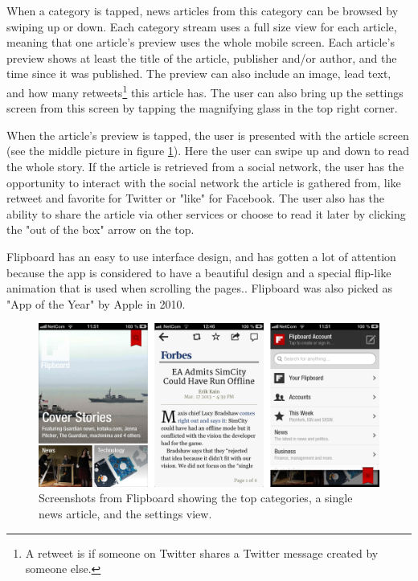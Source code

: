 When a category is tapped, news articles from this category can be browsed by swiping up or down. Each category stream uses a full size view for each article, meaning that one article's preview uses the whole mobile screen. Each article's preview shows at least the title of the article, publisher and/or author, and the time since it was published. The preview can also include an image, lead text, and how many retweets\footnote{A retweet is if someone on Twitter shares a Twitter message created by someone else.} this article has. The user can also bring up the settings screen from this screen by tapping the magnifying glass in the top right corner.

When the article's preview is tapped, the user is presented with the article screen (see the middle picture in figure \ref{screenshots_flipboard}). Here the user can swipe up and down to read the whole story. If the article is retrieved from a social network, the user has the opportunity to interact with the social network the article is gathered from, like retweet and favorite for Twitter or "like" for Facebook. The user also has the ability to share the article via other services or choose to read it later by clicking the "out of the box" arrow on the top.

Flipboard has an easy to use interface design, and has gotten a lot of attention because the app is considered to have a beautiful design\cite{flipboard_design} and a special flip-like animation that is used when scrolling the pages.\cite{flipboard_video}\cite{flipboard_animation}. Flipboard was also picked as "App of the Year" by Apple in 2010\cite{flipboard_app_of_the_year}.

\begin{figure}[!htbp]
\centering
\includegraphics[width=130mm]{GFX/screenshots/flipboard.png}
\caption{Screenshots from Flipboard showing the top categories, a single news article, and the settings view.}
\label{screenshots_flipboard}
\end{figure}

